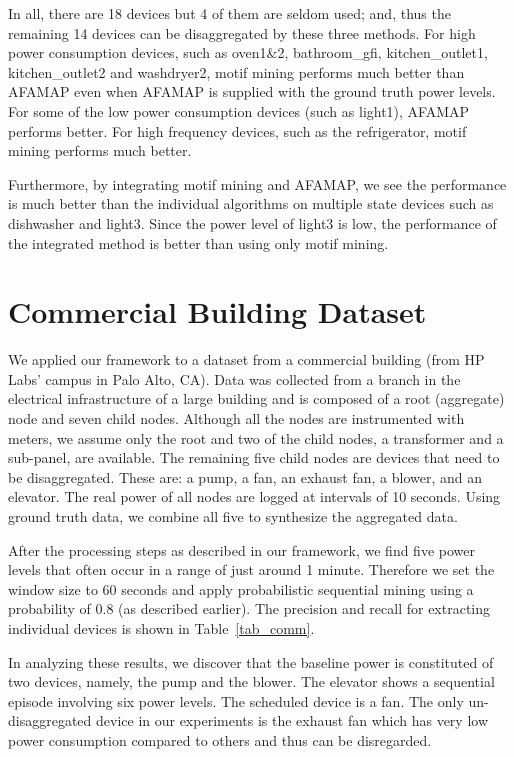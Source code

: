 In all, there are 18 devices but 4 of them are seldom used; and, thus
the remaining 14 devices can be disaggregated by these three methods.
For high power consumption devices, such as oven1\&2, bathroom\_gfi,
kitchen\_outlet1, kitchen\_outlet2 and washdryer2, motif mining performs much better than
AFAMAP even when AFAMAP is supplied with the ground truth power levels.
For some of the low power consumption devices
(such as light1), AFAMAP performs better.
For high frequency devices, such as the refrigerator, motif mining performs much better.

Furthermore, by integrating motif mining and AFAMAP, we see
the performance is much better than the individual algorithms
on multiple state devices such as dishwasher and light3.
Since the power level of light3 is low, the performance
of the integrated method is better than using
only motif mining.

%
\section{Commercial Building Dataset}
We applied our framework to a
dataset from a commercial building (from HP Labs' campus in Palo Alto, CA).
Data was collected from a branch in the electrical infrastructure of a large
building and is composed of a root (aggregate) node and seven child
nodes. Although all the nodes are instrumented with meters, we assume only
the root and two of the child nodes, a transformer and a sub-panel, are
available.
The remaining five child nodes are devices that need to be
disaggregated. These are: a pump, a fan, an exhaust fan, a blower, and an
elevator.
The real power of all nodes are logged at intervals of 10 seconds.
Using ground truth data, we combine all five to synthesize the aggregated data.

After the processing steps as described in our framework, we find five power
levels that often occur in a range of just around 1 minute.
Therefore we set the window size to 60 seconds and apply
probabilistic sequential mining using a probability of 0.8 (as described
earlier).
The precision and recall for extracting individual devices is shown in Table~\ref{tab_comm}.

%
In analyzing these results, we discover that
the baseline power is constituted of two devices, namely,
the pump and the blower.
The elevator shows a sequential episode involving six power levels.
The scheduled device is a fan.
The only un-disaggregated device in our experiments is the exhaust fan
which has very low power consumption compared to others and thus can be disregarded.

